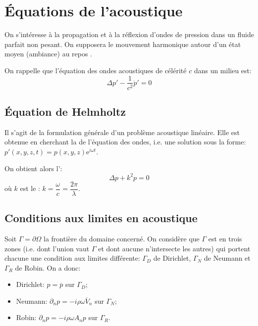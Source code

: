 \medskip
\section{Équations de l'acoustique}
On s'intéresse à la propagation et à la réflexion d'ondes de pression dans un
fluide parfait non pesant.
On supposera le mouvement harmonique autour d'un état moyen (ambiance) au repos
.

\medskip
On rappelle que l'équation des ondes acoustiques de célérité $c$ dans un milieu est:
\begin{equation}
\Delta p' - \dfrac1{c^2} \ddot{p}' = 0
\end{equation}

\medskip
\subsection{Équation de Helmholtz}
Il s'agit de la formulation générale d'un problème acoustique linéaire.
Elle est obtenue en cherchant la  de l'équation
des ondes, i.e. une solution sous la forme: $p'(x,y,z,t)=p(x,y,z)\mathrm e^{i\omega t}$.

On obtient alors l':
\begin{equation} \Delta p + k^2 p=0 \end{equation}
où $k$ est le : $k=\dfrac\omega{c}=\dfrac{2\pi}\lambda$.

\medskip
\subsection{Conditions aux limites en acoustique}
Soit $\Gamma=\partial\Omega$ la frontière du domaine concerné.
On considère que $\Gamma$ est  en trois zones (i.e. dont
l'union vaut $\Gamma$ et dont aucune n'intersecte les autres) qui
portent chacune une condition aux limites différente: $\Gamma_D$ de Dirichlet,
$\Gamma_N$ de Neumann et $\Gamma_R$ de Robin.
\medskip
On a donc:
\begin{itemize}
   \item Dirichlet: $p=\overline{p}$ sur $\Gamma_D$;\\[-2ex]
   \item Neumann: $\partial_n p = -i\rho\omega \overline{V}_n$ sur $\Gamma_N$;\\[-2ex]
   \item Robin: $\partial_n p=-i\rho\omega A_n p$ sur $\Gamma_R$.
\end{itemize}
\medskip{}
